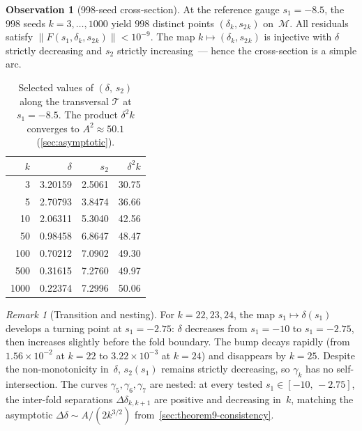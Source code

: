 \documentclass[11pt,a4paper]{article}
\theoremstyle{plain}
\theoremstyle{definition}
\newtheorem{observation}[theorem]{Observation}
\theoremstyle{remark}
\newtheorem{remark}[theorem]{Remark}
\newcommand{\norm}[1]{\lVert #1 \rVert}
\begin{document}
\begin{observation}[998-seed cross-section]
\label{obs:cross-section}
At the reference gauge $s_1 = -8.5$, the $998$ seeds
$k = 3,\ldots,1000$ yield $998$ distinct points
$(\delta_k, s_2{}_k)$ on~$\mathcal{M}$.  All residuals
satisfy $\norm{F(s_1, \delta_k, s_2{}_k)} < 10^{-9}$.
The map $k \mapsto (\delta_k, s_2{}_k)$ is injective with
$\delta$ strictly decreasing and $s_2$ strictly increasing~---
hence the cross-section is a simple arc.
\end{observation}

\begin{table}[ht]
\centering
\caption{Selected values of $(\delta,\, s_2)$ along the
  transversal $\mathcal{T}$ at $s_1 = -8.5$.  The product
  $\delta^2 k$ converges to $A^2 \approx 50.1$
  (\cref{sec:asymptotic}).}
\label{tab:transversal}
\smallskip
\begin{tabular}{@{}r@{\quad}r@{\quad}r@{\quad}r@{}}
\toprule
$k$ & $\delta$ & $s_2$ & $\delta^2 k$ \\
\midrule
3    & 3.20159 & 2.5061 & 30.75 \\
5    & 2.70793 & 3.8474 & 36.66 \\
10   & 2.06311 & 5.3040 & 42.56 \\
50   & 0.98458 & 6.8647 & 48.47 \\
100  & 0.70212 & 7.0902 & 49.30 \\
500  & 0.31615 & 7.2760 & 49.97 \\
1000 & 0.22374 & 7.2996 & 50.06 \\
\bottomrule
\end{tabular}
\end{table}

\begin{remark}[Transition and nesting]
\label{obs:transition}
For $k = 22, 23, 24$, the map $s_1 \mapsto \delta(s_1)$
develops a turning point at $s_1 = -2.75$: $\delta$ decreases
from $s_1 = -10$ to $s_1 = -2.75$, then increases slightly
before the fold boundary.  The bump decays rapidly
(from $1.56 \times 10^{-2}$ at $k=22$ to
$3.22 \times 10^{-3}$ at $k=24$) and disappears by $k = 25$.
Despite the non-monotonicity in~$\delta$, $s_2(s_1)$ remains
strictly decreasing, so $\gamma_k$ has no self-intersection.
The curves $\gamma_5, \gamma_6, \gamma_7$ are nested:
at every tested $s_1 \in [-10,\, -2.75]$, the inter-fold
separations $\Delta\delta_{k,k+1}$ are positive and
decreasing in~$k$, matching the asymptotic
$\Delta\delta \sim A/(2k^{3/2})$
from~\cref{sec:theorem9-consistency}.
\end{remark}
\end{document}
